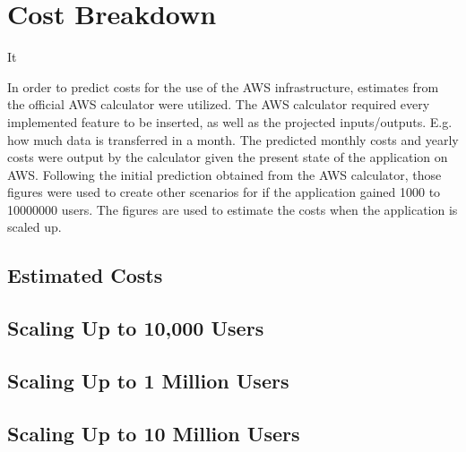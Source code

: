 \chapter{Cost Breakdown}\label{ch:cost-breakdown}

It

In order to predict costs for the use of the AWS infrastructure, estimates from the official AWS
calculator were utilized. The AWS calculator required every implemented feature to be
inserted, as well as the projected inputs/outputs. E.g. how much data is transferred in a month.
The predicted monthly costs and yearly costs were output by the calculator given the present
state of the application on AWS. Following the initial prediction obtained from the AWS
calculator, those figures were used to create other scenarios for if the application gained 1000
to 10000000 users. The figures are used to estimate the costs when the application is scaled
up.


\section{Estimated Costs}\label{sec:estimated-costs}


\section{Scaling Up to 10,000 Users}\label{sec:scaling-up-to-10000-users}


\section{Scaling Up to 1 Million Users}\label{sec:scaling-up-to-1-million-users}


\section{Scaling Up to 10 Million Users}\label{sec:scaling-up-to-10-million-users}
